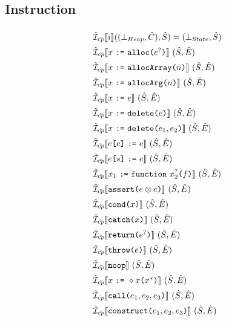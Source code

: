 \subsection{Instruction}
\[
\renewcommand\arraystretch{1.5}
\begin{array}{l}

\aI_{\acp} \lbr i \rbr ((\bot_{Heap}, \hat{C}), \hat{S})  = (\bot_{State}, \hat{S}) \\
\aI_{\acp} \lbr x~\verb+:=+~\TT{alloc}\verb+(+ e^{?} \verb+)+ \rbr\ (\hat{S}, \hat{E}) \\
\aI_{\acp} \lbr x~\verb+:=+~\TT{allocArray}\verb+(+n\verb+)+ \rbr\ (\hat{S}, \hat{E}) \\
\aI_{\acp} \lbr x~\verb+:=+~\TT{allocArg}\verb+(+n\verb+)+ \rbr\ (\hat{S}, \hat{E}) \\
\aI_{\acp} \lbr x ~\verb+:=+~ e \rbr\ (\hat{S}, \hat{E}) \\
\aI_{\acp} \lbr x ~\verb+:=+~ \TT{delete}\verb+(+e\verb+)+ \rbr\ (\hat{S}, \hat{E}) \\
\aI_{\acp} \lbr x ~\verb+:=+~ \TT{delete}\verb+(+e_1,e_2\verb+)+ \rbr\ (\hat{S}, \hat{E}) \\
\aI_{\acp} \lbr e\verb+[+e\verb+]+ ~\verb+:=+~ e \rbr\ (\hat{S}, \hat{E}) \\
\aI_{\acp} \lbr e\verb+[+s\verb+]+ ~\verb+:=+~ e \rbr\ (\hat{S}, \hat{E}) \\
\aI_{\acp} \lbr x_1 ~\verb+:=+~ \TT{function} ~x_2^{?}\verb+(+f\verb+)+ \rbr\ (\hat{S}, \hat{E}) \\
\aI_{\acp} \lbr \TT{assert}\verb+(+e\inop e\verb+)+ \rbr\ (\hat{S}, \hat{E}) \\
\aI_{\acp} \lbr \TT{cond}\verb+(+x\verb+)+ \rbr\ (\hat{S}, \hat{E}) \\
\aI_{\acp} \lbr \TT{catch}\verb+(+x\verb+)+ \rbr\ (\hat{S}, \hat{E}) \\
\aI_{\acp} \lbr \TT{return}\verb+(+e^{?}\verb+)+ \rbr\ (\hat{S}, \hat{E}) \\
\aI_{\acp} \lbr \TT{throw}\verb+(+e\verb+)+ \rbr\ (\hat{S}, \hat{E}) \\
\aI_{\acp} \lbr \TT{noop} \rbr\ (\hat{S}, \hat{E}) \\
\aI_{\acp} \lbr x ~\verb+:=+~\ensuremath{\diamond}x\verb+(+x^{*}\verb+)+ \rbr\ (\hat{S}, \hat{E}) \\
\aI_{\acp} \lbr \TT{call}\verb+(+e_1,e_2,e_3\verb+)+ \rbr\ (\hat{S}, \hat{E}) \\
\aI_{\acp} \lbr \TT{construct}\verb+(+e_1,e_2,e_3\verb+)+ \rbr\ (\hat{S}, \hat{E}) \\

\end{array}
\]

